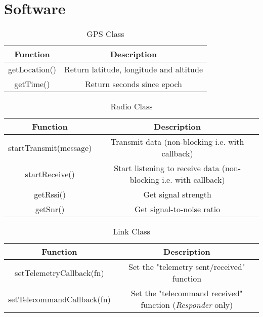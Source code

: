 \section{Software}
\begin{table}[!htb]
  \centering
  \caption{GPS Class}
  \renewcommand{\arraystretch}{1.2}
  \begin{tabular}{ |c|c| }
  \hline
  \textbf{Function}        & \textbf{Description}    \\
  \hline
    getLocation()              & Return latitude, longitude and altitude \\
    getTime()                  & Return seconds since epoch \\
  \hline
  \end{tabular}
  \label{tab:gpsUML}
\end{table}

\begin{table}[!htb]
  \centering
  \caption{Radio Class}
  \renewcommand{\arraystretch}{1.2}
  \begin{tabular}{ |c|c| }
  \hline
  \textbf{Function}        & \textbf{Description}    \\
  \hline
    startTransmit(message)              & Transmit data (non-blocking i.e. with callback) \\
    startReceive()                      & Start listening to receive data (non-blocking i.e. with callback) \\
    getRssi()                           & Get signal strength \\
    getSnr()                            & Get signal-to-noise ratio \\
  \hline
  \end{tabular}
  \label{tab:radioUML}
\end{table}

\begin{table}[!htb]
  \centering
  \caption{Link Class}
  \renewcommand{\arraystretch}{1.2}
  \begin{tabular}{ |c|c| }
  \hline
  \textbf{Function}        & \textbf{Description}    \\
  \hline
  setTelemetryCallback(fn)                    & Set the "telemetry sent/received" function  \\
  setTelecommandCallback(fn)                  & Set the "telecommand received" function (\textit{Responder} only) \\
  \hline
  \end{tabular}
  \label{tab:linkUML}
\end{table}

